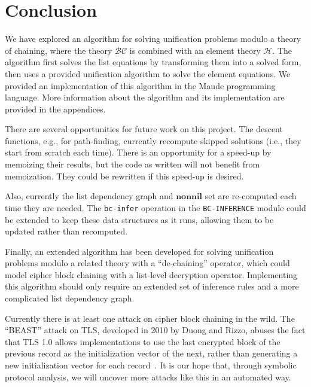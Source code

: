 \documentclass[11pt]{article}
\newcommand{\BC}{\mathcal{BC}}
\newcommand{\HH}{\mathcal{H}}
\newcommand{\Nonnil}{\mathbf{nonnil}}
\begin{document}
\section{Conclusion}\label{section:conclusion}

We have explored an algorithm for solving unification problems modulo a theory
of chaining, where the theory $\BC$ is combined with an element theory $\HH$.
The algorithm first solves the list equations by transforming them into a
solved form, then uses a provided unification algorithm to solve the element
equations. We provided an implementation of this algorithm in the Maude
programming language. More information about the algorithm and its
implementation are provided in the appendices.

There are several opportunities for future work on this project. The descent
functions, e.g., for path-finding, currently recompute skipped solutions (i.e.,
they start from scratch each time). There is an opportunity for a speed-up by
memoizing their results, but the code as written will not benefit from
memoization. They could be rewritten if this speed-up is desired.

Also, currently the list dependency graph and $\Nonnil$ set are re-computed
each time they are needed. The \lstinline|bc-infer| operation in the
\lstinline|BC-INFERENCE| module could be extended to keep these data structures
as it runs, allowing them to be updated rather than recomputed.

Finally, an extended algorithm has been developed for solving unification
problems modulo a related theory with a ``de-chaining'' operator, which could
model cipher block chaining with a list-level decryption operator. Implementing
this algorithm should only require an extended set of inference rules and a
more complicated list dependency graph.

Currently there is at least one attack on cipher block chaining in the wild.
The ``BEAST'' attack on TLS, developed in 2010 by Duong and Rizzo, abuses the
fact that TLS 1.0 allows implementations to use the last encrypted block of the
previous record as the initialization vector of the next, rather than
generating a new initialization vector for each
record~\cite{rizzo2010practical, ekr2011security}. It is our hope that, through
symbolic protocol analysis, we will uncover more attacks like this in an
automated way.



\clearpage
\appendix
\end{document}
